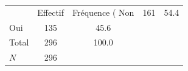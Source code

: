 {
\def\sym#1{\ifmmode^{#1}\else\(^{#1}\)\fi}
\begin{tabular}{l*{1}{cc}}
\toprule
            &    Effectif&Fréquence (%
\midrule
Non         &         161&        54.4\\
Oui         &         135&        45.6\\
Total       &         296&       100.0\\
\midrule
\(N\)       &         296&            \\
\bottomrule
\end{tabular}
}
